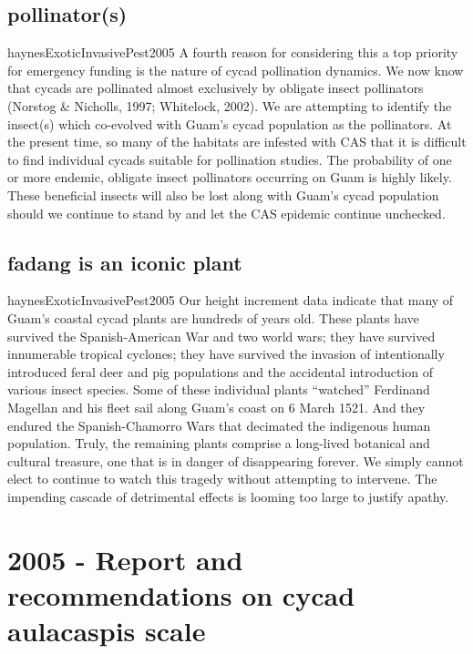 \begin{appendices}
\subsection{pollinator(s)}
\begin{displaycquote}{haynesExoticInvasivePest2005}
A fourth reason for considering this a top priority for emergency funding is the nature of cycad
pollination dynamics. We now know that cycads are pollinated almost exclusively by obligate insect
pollinators (Norstog \& Nicholls, 1997; Whitelock, 2002). We are attempting to identify the insect(s)
which co-evolved with Guam’s cycad population as the pollinators. At the present time, so many of
the habitats are infested with CAS that it is difficult to find individual cycads suitable for pollination
studies. The probability of one or more endemic, obligate insect pollinators occurring on Guam is
highly likely. These beneficial insects will also be lost along with Guam’s cycad population should we
continue to stand by and let the CAS epidemic continue unchecked.
\end{displaycquote}

\subsection{fadang is an iconic plant}
\begin{displaycquote}{haynesExoticInvasivePest2005}
Our height increment data indicate that many of Guam’s coastal cycad plants are hundreds of years
old. These plants have survived the Spanish-American War and two world wars; they have survived
innumerable tropical cyclones; they have survived the invasion of intentionally introduced feral deer
and pig populations and the accidental introduction of various insect species. Some of these individual
plants “watched” Ferdinand Magellan and his fleet sail along Guam’s coast on 6 March 1521. And
they endured the Spanish-Chamorro Wars that decimated the indigenous human population. Truly, the
remaining plants comprise a long-lived botanical and cultural treasure, one that is in danger of
disappearing forever. We simply cannot elect to continue to watch this tragedy without attempting to
intervene. The impending cascade of detrimental effects is looming too large to justify apathy.
\end{displaycquote}

\section{2005 - Report and recommendations on cycad aulacaspis scale}


\end{appendices}
